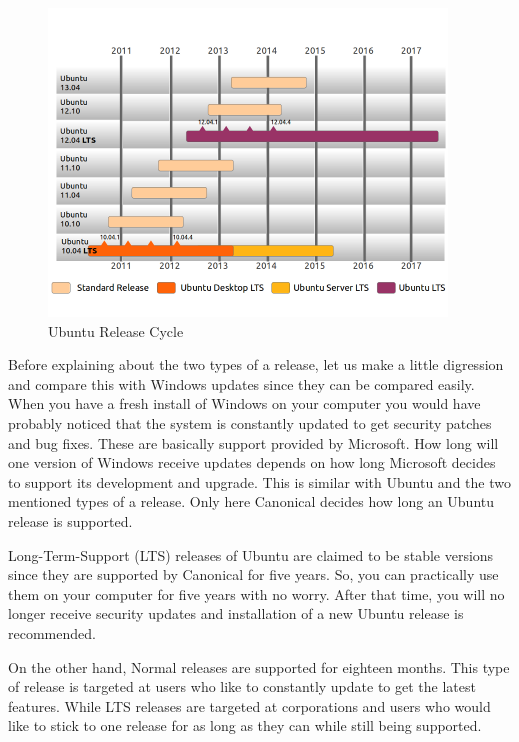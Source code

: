 \begin{figure}[h]	
	\begin{center}
	\includegraphics[width=300pt]{./images/about-ubuntu/ubuntu-release-cycle.png}
	\caption{Ubuntu Release Cycle}	
	\label{fig:ubuntu-release-cycle}	
	\end{center}
\end{figure}

\par \noindent Before explaining about the two types of a release, let us make a little digression and compare this with Windows updates since they can be compared easily. When you have a fresh install of Windows on your computer you would have probably noticed that the system is constantly updated to get security patches and bug fixes. These are basically support provided by Microsoft. How long will one version of Windows receive updates depends on how long Microsoft decides to support its development and upgrade. This is similar with Ubuntu and the two mentioned types of a release. Only here Canonical  decides how long an Ubuntu release is supported. \\

\par \noindent Long-Term-Support (LTS) releases of Ubuntu are claimed to be stable versions since they are supported by Canonical for five years. So, you can practically use them on your computer for five years with no worry. After that time, you will no longer receive security updates and installation of a new Ubuntu release is recommended.\\

\par \noindent On the other hand, Normal releases are supported for eighteen months. This type of release is targeted at users who like to constantly update to get the latest features. While LTS releases are targeted at corporations and users who would like to stick to one release for as long as they can while still being supported.\\

